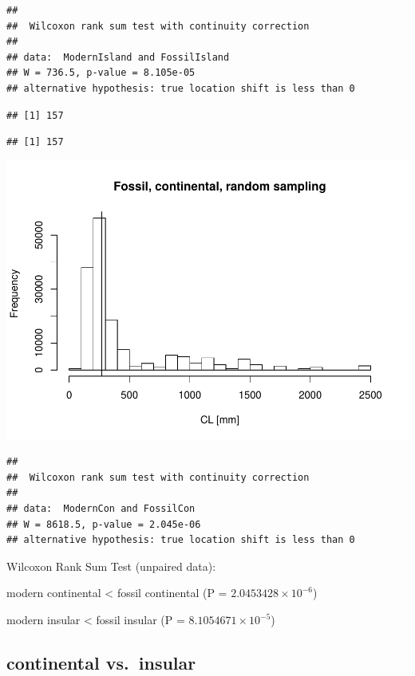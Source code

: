 \documentclass[]{article}
\begin{document}
\begin{verbatim}
## 
##  Wilcoxon rank sum test with continuity correction
## 
## data:  ModernIsland and FossilIsland
## W = 736.5, p-value = 8.105e-05
## alternative hypothesis: true location shift is less than 0
\end{verbatim}

\begin{verbatim}
## [1] 157
\end{verbatim}

\begin{verbatim}
## [1] 157
\end{verbatim}

\includegraphics{MA_JJ_files/figure-latex/RSMFCI-2.pdf}

\begin{verbatim}
## 
##  Wilcoxon rank sum test with continuity correction
## 
## data:  ModernCon and FossilCon
## W = 8618.5, p-value = 2.045e-06
## alternative hypothesis: true location shift is less than 0
\end{verbatim}

Wilcoxon Rank Sum Test (unpaired data):

modern continental \textless{} fossil continental (P =
\(2.0453428\times 10^{-6}\))

modern insular \textless{} fossil insular (P =
\(8.1054671\times 10^{-5}\))

\newpage

\subsection{continental vs.~insular}\label{continental-vs.insular-1}
\end{document}

